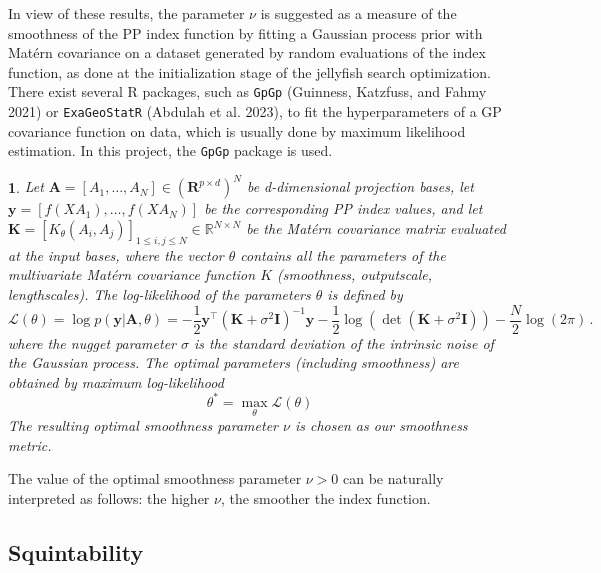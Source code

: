 \documentclass[
  12pt,
]{interact}
\theoremstyle{plain}
\newtheorem{defn}{\protect\definitionname}
\providecommand{\definitionname}{Definition}
\begin{document}
In view of these results, the parameter \(\nu\) is suggested as a
measure of the smoothness of the PP index function by fitting a Gaussian
process prior with Matérn covariance on a dataset generated by random
evaluations of the index function, as done at the initialization stage
of the jellyfish search optimization. There exist several R packages,
such as \texttt{GpGp} (Guinness, Katzfuss, and Fahmy 2021) or
\texttt{ExaGeoStatR} (Abdulah et al. 2023), to fit the hyperparameters
of a GP covariance function on data, which is usually done by maximum
likelihood estimation. In this project, the \texttt{GpGp} package is
used.

\begin{defn}
Let $\mathbf{A}=[A_1, \ldots, A_N] \in (\mathbf{R}^{p \times d})^N$ be d-dimensional projection bases, let $\mathbf{y}=[f(XA_1),\ldots,f(XA_N)]$ be the corresponding PP index values, and let $\mathbf{K}=[K_\theta(A_{i},A_{j})]_{1\leq i,j\leq N}\in\mathbb{R}^{N\times N}$ be the Matérn covariance matrix evaluated at the input bases, where the vector $\theta$ contains all the parameters of the multivariate Matérn covariance function $K$ (smoothness, outputscale, lengthscales). The log-likelihood of the parameters $\theta$ is defined by 
\begin{equation}
\mathcal{L}(\theta)=\log p(\mathbf{y}\left|\mathbf{A},\theta\right.)=-\frac{1}{2}\mathbf{y}^{\top}(\mathbf{K}+\sigma^{2}\mathbf{I})^{-1}\mathbf{y}-\frac{1}{2}\mathrm{\log}(\det(\mathbf{K}+\sigma^{2}\mathbf{I}))-\frac{N}{2}\log(2\pi)\,.\label{eq:gp_log_likelihood}
\end{equation}
where the nugget parameter $\sigma$ is the standard deviation of the intrinsic noise of the Gaussian process.
The optimal parameters (including smoothness) are obtained by maximum log-likelihood
\begin{equation}
\theta^* = \underset{\theta}{\max}\mathcal{L}(\theta)
\end{equation}
The resulting optimal smoothness parameter $\nu$ is chosen as our smoothness metric.
\end{defn}

The value of the optimal smoothness parameter \(\nu>0\) can be naturally
interpreted as follows: the higher \(\nu\), the smoother the index
function.

\subsection{Squintability}\label{sec-squintability}
\end{document}
